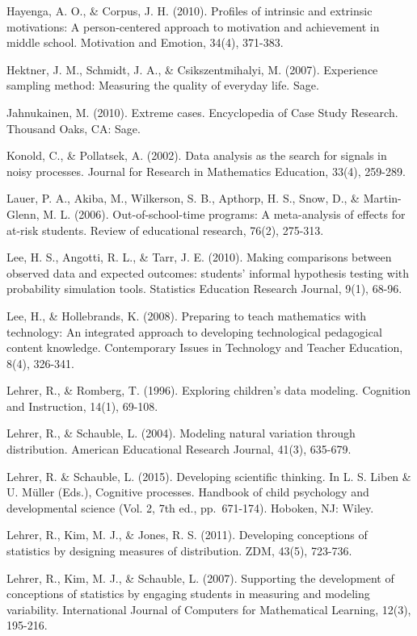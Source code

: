 \documentclass[]{book}
\theoremstyle{definition}
\theoremstyle{definition}
\theoremstyle{definition}
\theoremstyle{remark}
\begin{document}
Hayenga, A. O., \& Corpus, J. H. (2010). Profiles of intrinsic and
extrinsic motivations: A person-centered approach to motivation and
achievement in middle school. Motivation and Emotion, 34(4), 371-383.

Hektner, J. M., Schmidt, J. A., \& Csikszentmihalyi, M. (2007).
Experience sampling method: Measuring the quality of everyday life.
Sage.

Jahnukainen, M. (2010). Extreme cases. Encyclopedia of Case Study
Research. Thousand Oaks, CA: Sage.

Konold, C., \& Pollatsek, A. (2002). Data analysis as the search for
signals in noisy processes. Journal for Research in Mathematics
Education, 33(4), 259-289.

Lauer, P. A., Akiba, M., Wilkerson, S. B., Apthorp, H. S., Snow, D., \&
Martin-Glenn, M. L. (2006). Out-of-school-time programs: A meta-analysis
of effects for at-risk students. Review of educational research, 76(2),
275-313.

Lee, H. S., Angotti, R. L., \& Tarr, J. E. (2010). Making comparisons
between observed data and expected outcomes: students' informal
hypothesis testing with probability simulation tools. Statistics
Education Research Journal, 9(1), 68-96.

Lee, H., \& Hollebrands, K. (2008). Preparing to teach mathematics with
technology: An integrated approach to developing technological
pedagogical content knowledge. Contemporary Issues in Technology and
Teacher Education, 8(4), 326-341.

Lehrer, R., \& Romberg, T. (1996). Exploring children's data modeling.
Cognition and Instruction, 14(1), 69-108.

Lehrer, R., \& Schauble, L. (2004). Modeling natural variation through
distribution. American Educational Research Journal, 41(3), 635-679.

Lehrer, R. \& Schauble, L. (2015). Developing scientific thinking. In L.
S. Liben \& U. Müller (Eds.), Cognitive processes. Handbook of child
psychology and developmental science (Vol. 2, 7th ed., pp.~671-174).
Hoboken, NJ: Wiley.

Lehrer, R., Kim, M. J., \& Jones, R. S. (2011). Developing conceptions
of statistics by designing measures of distribution. ZDM, 43(5),
723-736.

Lehrer, R., Kim, M. J., \& Schauble, L. (2007). Supporting the
development of conceptions of statistics by engaging students in
measuring and modeling variability. International Journal of Computers
for Mathematical Learning, 12(3), 195-216.
\end{document}
